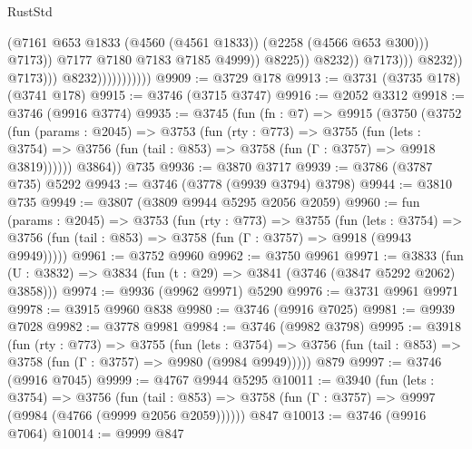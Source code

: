 \begin{lexlean}{RustStd}
\begin{coremodule}
                                                          (@7161
                                                            @653
                                                            @1833
                                                            (@4560 (@4561 @1833))
                                                            (@2258 (@4566 @653 @300)))
                                                          @7173))
                                                      @7177
                                                      @7180
                                                      @7183
                                                      @7185
                                                      @4999))
                                                  @8225))
                                              @8232))
                                          @7173)))
                                    @8232))
                                @7173)))
                          @8232)))))))))))
@9909 := @3729 @178
@9913 := @3731 (@3735 @178) (@3741 @178)
@9915 := @3746 (@3715 @3747)
@9916 := @2052 @3312
@9918 := @3746 (@9916 @3774)
@9935 := @3745
    (fun (fn : @7) =>
    @9915
      (@3750
        (@3752
          (fun (params : @2045) =>
          @3753
            (fun (rty : @773) =>
            @3755
              (fun (lets : @3754) =>
              @3756 (fun (tail : @853) => @3758 (fun (Γ : @3757) => @9918 @3819))))))
        @3864))
    @735
@9936 := @3870 @3717
@9939 := @3786 (@3787 @735) @5292
@9943 := @3746 (@3778 (@9939 @3794) @3798)
@9944 := @3810 @735
@9949 := @3807 (@3809 @9944 @5295 @2056 @2059)
@9960 := fun (params : @2045) =>
  @3753
    (fun (rty : @773) =>
    @3755
      (fun (lets : @3754) =>
      @3756 (fun (tail : @853) => @3758 (fun (Γ : @3757) => @9918 (@9943 @9949)))))
@9961 := @3752 @9960
@9962 := @3750 @9961
@9971 := @3833 (fun (U : @3832) => @3834 (fun (t : @29) => @3841 (@3746 (@3847 @5292 @2062) @3858)))
@9974 := @9936 (@9962 @9971) @5290
@9976 := @3731 @9961 @9971
@9978 := @3915 @9960 @838
@9980 := @3746 (@9916 @7025)
@9981 := @9939 @7028
@9982 := @3778 @9981
@9984 := @3746 (@9982 @3798)
@9995 := @3918
    (fun (rty : @773) =>
    @3755
      (fun (lets : @3754) =>
      @3756 (fun (tail : @853) => @3758 (fun (Γ : @3757) => @9980 (@9984 @9949)))))
    @879
@9997 := @3746 (@9916 @7045)
@9999 := @4767 @9944 @5295
@10011 := @3940
    (fun (lets : @3754) =>
    @3756
      (fun (tail : @853) => @3758 (fun (Γ : @3757) => @9997 (@9984 (@4766 (@9999 @2056 @2059))))))
    @847
@10013 := @3746 (@9916 @7064)
@10014 := @9999 @847

\end{coremodule}
\end{lexlean}
